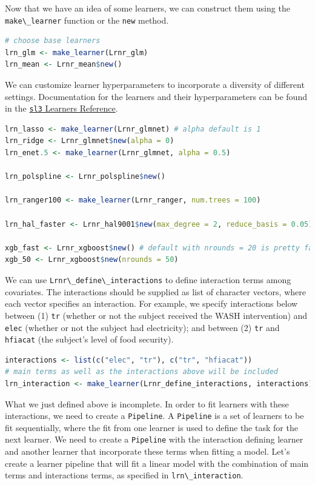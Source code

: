 \documentclass[
  12pt, krantz2,
]{krantz}
\newcommand{\passthrough}[1]{#1}
\theoremstyle{definition}
\theoremstyle{definition}
\theoremstyle{definition}
\newcommand{\1}{\mathbbm{1}}
\begin{document}
Now that we have an idea of some learners, we can construct them using the
\passthrough{\lstinline!make\_learner!} function or the \passthrough{\lstinline!new!} method.

\begin{lstlisting}[language=R]
# choose base learners
lrn_glm <- make_learner(Lrnr_glm)
lrn_mean <- Lrnr_mean$new()
\end{lstlisting}

We can customize learner hyperparameters to incorporate a diversity of different
settings. Documentation for the learners and their hyperparameters can be found
in the \href{https://tlverse.org/sl3/reference/index.html\#section-sl-learners}{\passthrough{\lstinline!sl3!} Learners
Reference}.

\begin{lstlisting}[language=R]
lrn_lasso <- make_learner(Lrnr_glmnet) # alpha default is 1
lrn_ridge <- Lrnr_glmnet$new(alpha = 0)
lrn_enet.5 <- make_learner(Lrnr_glmnet, alpha = 0.5)

lrn_polspline <- Lrnr_polspline$new()

lrn_ranger100 <- make_learner(Lrnr_ranger, num.trees = 100)

lrn_hal_faster <- Lrnr_hal9001$new(max_degree = 2, reduce_basis = 0.05)

xgb_fast <- Lrnr_xgboost$new() # default with nrounds = 20 is pretty fast
xgb_50 <- Lrnr_xgboost$new(nrounds = 50)
\end{lstlisting}

We can use \passthrough{\lstinline!Lrnr\_define\_interactions!} to define interaction terms among
covariates. The interactions should be supplied as list of character vectors,
where each vector specifies an interaction. For example, we specify
interactions below between (1) \passthrough{\lstinline!tr!} (whether or not the subject received the
WASH intervention) and \passthrough{\lstinline!elec!} (whether or not the subject had electricity); and
between (2) \passthrough{\lstinline!tr!} and \passthrough{\lstinline!hfiacat!} (the subject's level of food security).

\begin{lstlisting}[language=R]
interactions <- list(c("elec", "tr"), c("tr", "hfiacat"))
# main terms as well as the interactions above will be included
lrn_interaction <- make_learner(Lrnr_define_interactions, interactions)
\end{lstlisting}

What we just defined above is incomplete. In order to fit learners with these
interactions, we need to create a \passthrough{\lstinline!Pipeline!}. A \passthrough{\lstinline!Pipeline!} is a set of learners
to be fit sequentially, where the fit from one learner is used to define the
task for the next learner. We need to create a \passthrough{\lstinline!Pipeline!} with the interaction
defining learner and another learner that incorporate these terms when fitting
a model. Let's create a learner pipeline that will fit a linear model with the
combination of main terms and interactions terms, as specified in
\passthrough{\lstinline!lrn\_interaction!}.
\end{document}
